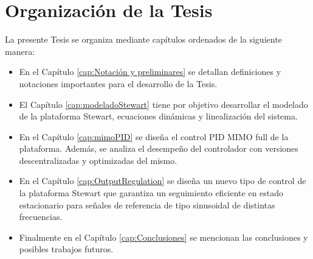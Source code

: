 \section{Organización de la Tesis}

La presente Tesis se organiza mediante capítulos ordenados de la siguiente manera:
\begin{itemize}
    \item  En el Capítulo \ref{cap:Notación y preliminares} se detallan definiciones y notaciones importantes para el desarrollo de la Tesis. 
    \item El Capítulo \ref{cap:modeladoStewart} tiene por objetivo desarrollar el modelado de la plataforma Stewart, ecuaciones dinámicas y linealización del sistema.
    \item En el Capítulo \ref{cap:mimoPID} se diseña el control PID MIMO full de la plataforma. Además, se analiza el desempeño del controlador con versiones descentralizadas y optimizadas del mismo.
    \item En el Capítulo \ref{cap:OutputRegulation} se diseña un nuevo tipo de control de la plataforma Stewart que garantiza un seguimiento eficiente en estado estacionario para señales de referencia de tipo sinusoidal de distintas frecuencias. 
    \item Finalmente en el Capítulo \ref{cap:Conclusiones} se mencionan las conclusiones y posibles trabajos futuros.
\end{itemize}
